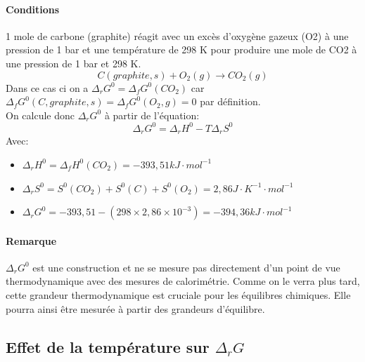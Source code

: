 \documentclass[10pt,a4paper]{book}
\begin{document}
\paragraph{Conditions} 1 mole de carbone (graphite) réagit avec un excès d’oxygène gazeux (O2) à une pression de 1 bar et une température de 298 K pour produire une mole de CO2 à une pression de 1 bar et 298 K. 
\[C(graphite, s) + O_2(g) \rightarrow CO_2(g)\]
Dans ce cas ci on a \(\Delta_rG^0 = \Delta_fG^0(CO_2)\) car \(\Delta_fG^0(C, graphite, s) = \Delta_fG^0(O_2, g) = 0\) par définition. \\
On calcule donc \(\Delta_rG^0\) à partir de l'équation:
\[\Delta_rG^0 = \Delta_rH^0 - T\Delta_rS^0\]
Avec: 
\begin{itemize}
\item \(\Delta_rH^0 = \Delta_fH^0(CO_2) = -393,51 kJ\cdot mol^{-1}\) 
\item \(\Delta_rS^0 = S^0(CO_2) + S^0(C) + S^0(O_2) = 2,86 J\cdot K^{-1} \cdot mol^{-1}\) 
\item \(\Delta_rG^0 = -393,51 - (298 \times 2,86 \times 10^{-3}) = -394,36 kJ\cdot mol^{-1} \)
\end{itemize}
\paragraph{Remarque} \(\Delta_rG^0\) est une construction et ne se mesure pas directement d’un point de vue thermodynamique avec des mesures de calorimétrie. Comme on le verra plus tard, cette grandeur thermodynamique est cruciale pour les équilibres chimiques. Elle pourra ainsi être mesurée à partir des grandeurs d’équilibre.

\subsection{Effet de la température sur \texorpdfstring{$\Delta_rG$}{Delta G}}
\end{document}
